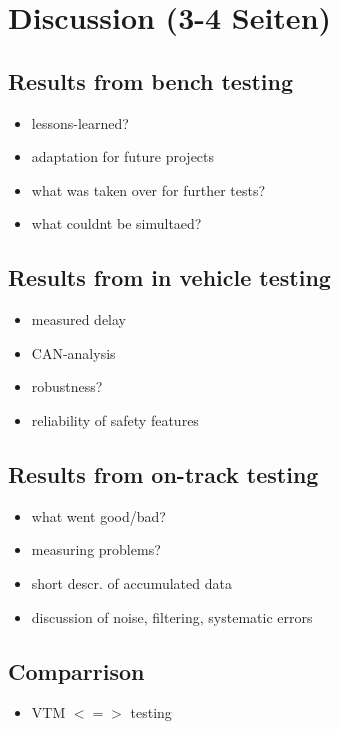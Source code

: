 \documentclass[ExampleMasters.tex]{subfiles}
\begin{document}
\clearpage
\chapter{Discussion (3-4 Seiten)}
\label{chap:discussion}

\section{Results from bench testing}
\label{sec:results_bench}

\begin{itemize}
	\item lessons-learned?
	\item adaptation for future projects
	\item what was taken over for further tests? 
	\item what couldnt be simultaed?
\end{itemize}

\section{Results from in vehicle testing}
\label{sec:results_vehicle_testing}

\begin{itemize}
	\item measured delay
	\item CAN-analysis
	\item robustness?
	\item reliability of safety features
\end{itemize}

\section{Results from on-track testing}
\label{sec:results_track}
\begin{itemize}
	\item what went good/bad?
	\item measuring problems?
	\item short descr. of accumulated data
	\item discussion of noise, filtering, systematic errors
\end{itemize}
\section{Comparrison}
\label{sec:results_comparrison}
\begin{itemize}
	\item VTM $<=>$ testing
\end{itemize}
\end{document}
